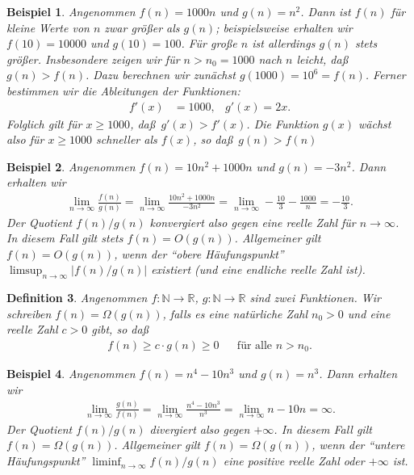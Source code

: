 \documentclass[10pt,reqno]{amsart}
\numberwithin{equation}{section}
\newcommand\NN{\mathbb N}
\newcommand\RR{\mathbb R}
\newtheorem{definition}{Definition}[section]
\newtheorem{example}[definition]{Beispiel}
\begin{document}
\begin{example}\upshape
Angenommen $f(n)=1000n$ und $g(n)=n^2$.
Dann ist $f(n)$ f\"ur kleine Werte von $n$ zwar gr\"o\ss er als $g(n)$; beispielsweise erhalten wir $f(10)=10000$ und $g(10)=100$.
F\"ur gro\ss e $n$ ist allerdings $g(n)$ stets gr\"o\ss er.
Insbesondere zeigen wir f\"ur $n>n_0=1000$ nach $n$ leicht, da\ss\ $g(n)>f(n)$.
Dazu berechnen wir zun\"achst $g(1000)=10^6=f(n)$.
Ferner bestimmen wir die Ableitungen der Funktionen:
\begin{align*}
	f'(x)&=1000,&g'(x)=2x.
\end{align*}
Folglich gilt f\"ur $x\geq1000$, da\ss\ $g'(x)>f'(x)$.
Die Funktion $g(x)$ w\"achst also f\"ur $x\geq1000$ schneller als $f(x)$, so da\ss\ $g(n)>f(n)$ 
\end{example}

\begin{example}\upshape
Angenommen $f(n)=10n^2+1000n$ und $g(n)=-3n^2$.
Dann erhalten wir
\begin{align*}
	\lim_{n\to\infty}\frac{f(n)}{g(n)}=\lim_{n\to\infty}\frac{10n^2+1000n}{-3n^2}=\lim_{n\to\infty}-\frac{10}3-\frac{1000}{n}=-\frac{10}3.
\end{align*}
Der Quotient $f(n)/g(n)$ konvergiert also gegen eine reelle Zahl f\"ur $n\to\infty$.
In diesem Fall gilt stets $f(n)=O(g(n))$.
Allgemeiner gilt $f(n)=O(g(n))$, wenn der ``obere H\"aufungspunkt'' $\limsup_{n\to\infty}|f(n)/g(n)|$ existiert (und eine endliche reelle Zahl ist).
\end{example}

\begin{definition}\label{def_Omega}
	Angenommen $f:\NN\to\RR$, $g:\NN\to\RR$ sind zwei Funktionen.
	Wir schreiben $f(n)=\Omega(g(n))$, falls es eine nat\"urliche Zahl $n_0>0$ und eine reelle Zahl $c>0$ gibt, so da\ss
	\begin{align*}
		f(n)\geq c\cdot g(n)\geq0&&\mbox{f\"ur alle }n>n_0.
	\end{align*}
\end{definition}

\begin{example}\upshape
Angenommen $f(n)=n^4-10n^3$ und $g(n)=n^3$.
Dann erhalten wir
\begin{align*}
	\lim_{n\to\infty}\frac{g(n)}{f(n)}=\lim_{n\to\infty}\frac{n^4-10n^3}{n^3}=\lim_{n\to\infty}n-10{n}=\infty.
\end{align*}
Der Quotient $f(n)/g(n)$ divergiert also gegen $+\infty$.
In diesem Fall gilt $f(n)=\Omega(g(n))$.
Allgemeiner gilt $f(n)=\Omega(g(n))$, wenn der ``untere H\"aufungspunkt'' $\liminf_{n\to\infty}f(n)/g(n)$ eine positive reelle Zahl oder $+\infty$ ist.
\end{example}
\end{document}
